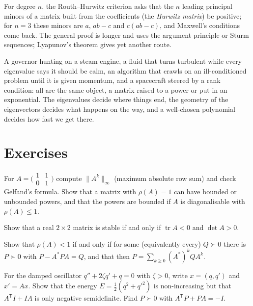 For degree $n$, the Routh--Hurwitz criterion asks that the $n$ leading principal minors of a matrix built from the coefficients (the
\emph{Hurwitz matrix}) be positive; for $n=3$ these minors are $a$, $ab-c$ and $c(ab-c)$, and Maxwell's conditions come back. The
general proof is longer and uses the argument principle or Sturm sequences; Lyapunov's theorem gives yet another route.

\begin{beauty}
A governor hunting on a steam engine, a fluid that turns turbulent while every eigenvalue says it should be calm, an algorithm that
crawls on an ill-conditioned problem until it is given momentum, and a spacecraft steered by a rank condition: all are the same
object, a matrix raised to a power or put in an exponential. The eigenvalues decide where things end, the geometry of the
eigenvectors decides what happens on the way, and a well-chosen polynomial decides how fast we get there.
\end{beauty}

\section{Exercises}

\begin{exercise}[$\star$]\label{ex:gelfandex}
For $A=\bigl(\begin{smallmatrix}1&1\\0&1\end{smallmatrix}\bigr)$ compute $\|A^k\|_\infty$ (maximum absolute row sum) and check Gelfand's
formula. Show that a matrix with $\rho(A)=1$ can have bounded or unbounded powers, and that the powers are bounded if $A$ is
diagonalisable with $\rho(A)\le1$.
\end{exercise}

\begin{exercise}[$\star$]\label{ex:hurwitz2}
Show that a real $2\times2$ matrix is stable if and only if $\operatorname{tr}A<0$ and $\det A>0$.
\end{exercise}

\begin{exercise}[$\star\star$]\label{ex:stein}
Show that $\rho(A)<1$ if and only if for some (equivalently every) $Q\succ0$ there is $P\succ0$ with $P-A^*PA=Q$, and that then
$P=\sum_{k\ge0}(A^*)^kQA^k$.
\end{exercise}

\begin{exercise}[$\star$]\label{ex:oscillator}
For the damped oscillator $q''+2\zeta q'+q=0$ with $\zeta>0$, write $x=(q,q')$ and $x'=Ax$. Show that the energy $E=\frac12(q^2+q'^2)$ is
non-increasing but that $A^{\mathsf T}I+IA$ is only negative semidefinite. Find $P\succ0$ with $A^{\mathsf T}P+PA=-I$.
\end{exercise}

